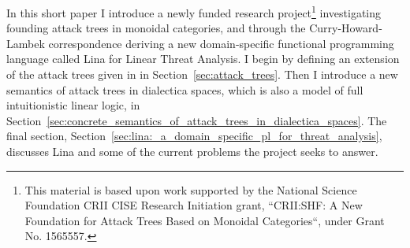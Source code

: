 \documentclass{llncs}
\begin{document}
In this short paper I introduce a newly funded research
project\footnote{This material is based upon work supported by the
  National Science Foundation CRII CISE Research Initiation grant,
  ``CRII:SHF: A New Foundation for Attack Trees Based on Monoidal
  Categories``, under Grant No. 1565557.}  investigating founding
attack trees in monoidal categories, and through the
Curry-Howard-Lambek correspondence deriving a new domain-specific
functional programming language called Lina for Linear Threat
Analysis.  I begin by defining an extension of the attack trees given
in \cite{Jhawar:2015} in Section~\ref{sec:attack_trees}.  Then I
introduce a new semantics of attack trees in dialectica spaces, which
is also a model of full intuitionistic linear logic, in
Section~\ref{sec:concrete_semantics_of_attack_trees_in_dialectica_spaces}.
The final section,
Section~\ref{sec:lina:_a_domain_specific_pl_for_threat_analysis},
discusses Lina and some of the current problems the project seeks to
answer.
\end{document}

